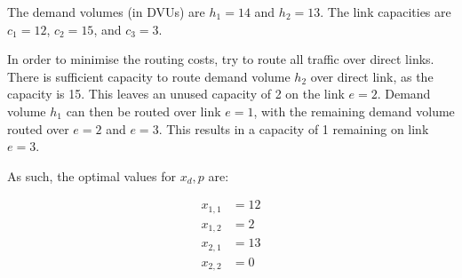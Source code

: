 The demand volumes (in DVUs) are $h_1 = 14$ and $h_2 = 13$. The link capacities
are $c_1 = 12$,  $c_2 = 15$, and $c_3 = 3$.

In order to minimise the routing costs, try to route all traffic over direct
links. There is sufficient capacity to route demand volume  $h_2$ over direct
link, as the capacity is 15. This leaves an unused capacity of 2 on the link
$e=2$. Demand volume  $h_1$ can then be routed over link  $e=1$, with the
remaining demand volume routed over  $e=2$ and  $e=3$. This results in a
capacity of 1 remaining on link  $e=3$.

As such, the optimal values for ${x_d,p}$ are:

\begin{align*}
	x_{1,1} &= 12 \\
	x_{1,2} &= 2 \\
	x_{2,1} &= 13 \\
	x_{2,2} &= 0
\end{align*}
